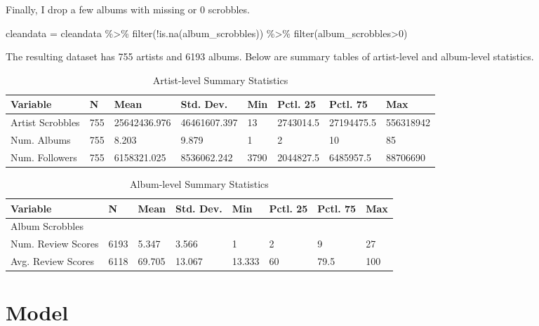\documentclass[
  11pt,
]{article}
\newenvironment{Shaded}{\begin{snugshade}}{\end{snugshade}}
\newcommand{\DecValTok}[1]{\textcolor[rgb]{0.00,0.00,0.81}{#1}}
\newcommand{\FunctionTok}[1]{\textcolor[rgb]{0.00,0.00,0.00}{#1}}
\newcommand{\NormalTok}[1]{#1}
\newcommand{\OtherTok}[1]{\textcolor[rgb]{0.56,0.35,0.01}{#1}}
\newcommand{\SpecialCharTok}[1]{\textcolor[rgb]{0.00,0.00,0.00}{#1}}
\begin{document}
Finally, I drop a few albums with missing or 0 scrobbles.

\begin{Shaded}
\begin{Highlighting}[]
\NormalTok{cleandata }\OtherTok{=}\NormalTok{ cleandata }\SpecialCharTok{\%\textgreater{}\%}
  \FunctionTok{filter}\NormalTok{(}\SpecialCharTok{!}\FunctionTok{is.na}\NormalTok{(album\_scrobbles)) }\SpecialCharTok{\%\textgreater{}\%}
  \FunctionTok{filter}\NormalTok{(album\_scrobbles}\SpecialCharTok{\textgreater{}}\DecValTok{0}\NormalTok{)}
\end{Highlighting}
\end{Shaded}

The resulting dataset has 755 artists and 6193 albums. Below are summary
tables of artist-level and album-level statistics.

\begin{table}[H]

\caption{\label{tab:unnamed-chunk-27}Artist-level Summary Statistics}
\centering
\begin{tabular}[t]{llllllll}
\toprule
Variable & N & Mean & Std. Dev. & Min & Pctl. 25 & Pctl. 75 & Max\\
\midrule
Artist Scrobbles & 755 & 25642436.976 & 46461607.397 & 13 & 2743014.5 & 27194475.5 & 556318942\\
Num. Albums & 755 & 8.203 & 9.879 & 1 & 2 & 10 & 85\\
Num. Followers & 755 & 6158321.025 & 8536062.242 & 3790 & 2044827.5 & 6485957.5 & 88706690\\
\bottomrule
\end{tabular}
\end{table}

\begin{table}[H]

\caption{\label{tab:unnamed-chunk-28}Album-level Summary Statistics}
\centering
\begin{tabular}[t]{llllllll}
\toprule
Variable & N & Mean & Std. Dev. & Min & Pctl. 25 & Pctl. 75 & Max\\
\midrule
Album Scrobbles &  &  &  &  &  &  & \\
Num. Review Scores & 6193 & 5.347 & 3.566 & 1 & 2 & 9 & 27\\
Avg. Review Scores & 6118 & 69.705 & 13.067 & 13.333 & 60 & 79.5 & 100\\
\bottomrule
\end{tabular}
\end{table}

\hypertarget{model}{%
\section{Model}\label{model}}
\end{document}
